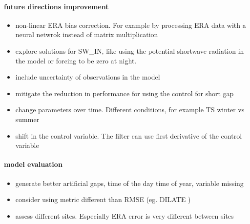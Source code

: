 \documentclass{article}
\begin{document}
\paragraph{future directions improvement}
\begin{itemize}
    \item non-linear ERA bias correction. For example by processing ERA data with a neural netwrok instead of matrix multiplication
    \item explore solutions for SW\_IN, like using the potential shortwave radiation in the model or forcing to be zero at night.
    \item include uncertainty of observations in the model
    \item mitigate the reduction in performance for using the control for short gap
    \item change parameters over time. Different conditions, for example TS winter vs summer
    \item shift in the control variable. The filter can use first derivative of the control variable 
\end{itemize}

\paragraph{model evaluation}
\begin{itemize}
    \item generate better artificial gaps, time of the day time of year, variable missing
    \item consider using metric different than RMSE (eg. DILATE \cite{guen_shape_nodate}) 
    \item assess different sites. Especially ERA error is very different between sites \cite{vuichard_filling_2015}
\end{itemize}





\end{document}
